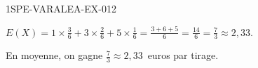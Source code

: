 \begin{corrige}{1SPE-VARALEA-EX-012}


$E(X) = 1 \times \frac{3}{6} + 3 \times \frac{2}{6} + 5 \times \frac{1}{6} = \frac{3+6+5}{6} = \frac{14}{6} = \frac{7}{3} \approx 2{,}33$.

En moyenne, on gagne $\frac{7}{3} \approx 2{,}33$~euros par tirage.

\end{corrige}
